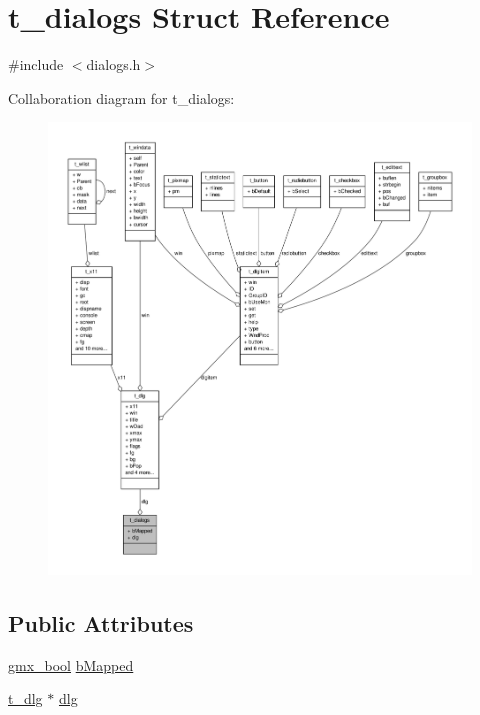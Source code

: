 \hypertarget{structt__dialogs}{\section{t\-\_\-dialogs \-Struct \-Reference}
\label{structt__dialogs}
}


{\ttfamily \#include $<$dialogs.\-h$>$}



\-Collaboration diagram for t\-\_\-dialogs\-:
\nopagebreak
\begin{figure}[H]
\begin{center}
\leavevmode
\includegraphics[width=350pt]{structt__dialogs__coll__graph}
\end{center}
\end{figure}
\subsection*{\-Public \-Attributes}
\begin{DoxyCompactItemize}
\item 
\hyperlink{include_2types_2simple_8h_a8fddad319f226e856400d190198d5151}{gmx\-\_\-bool} \hyperlink{structt__dialogs_af292ffc2ab0ee5faa0436608844d7373}{b\-Mapped}
\item 
\hyperlink{structt__dlg}{t\-\_\-dlg} $\ast$ \hyperlink{structt__dialogs_ab21280650a94287dfab8fb38385261f8}{dlg}
\end{DoxyCompactItemize}


